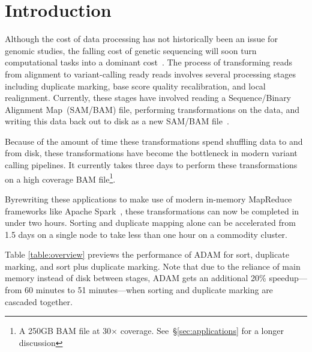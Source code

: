 \documentclass[10pt,twocolumn]{article}
\theoremstyle{plain}
\begin{document}



\cleardoublepage

\section{Introduction}
\label{sec:introduction}

Although the cost of data processing has not historically been an issue for genomic studies, the falling cost of genetic
sequencing will soon turn computational tasks into a dominant cost~\cite{nhgri}. The process of transforming reads
from alignment to variant-calling ready reads involves several processing stages including duplicate marking, base
score quality recalibration, and local realignment. Currently, these stages have involved reading a Sequence/Binary
Alignment Map~(SAM/BAM) file, performing transformations on the data, and writing this data back out to disk as a
new SAM/BAM file~\cite{li09}.

Because of the amount of time these transformations spend shuffling data to and from disk, these transformations have become
the bottleneck in modern variant calling pipelines. It currently takes three days to perform these transformations on a high
coverage BAM file\footnote{A 250GB BAM file at 30$\times$ coverage. See~\S\ref{sec:applications} for a longer discussion}. 

Byrewriting these applications to make use of modern in-memory MapReduce frameworks like Apache Spark~\cite{zaharia10}, these
transformations can now be completed in under two hours. Sorting and duplicate mapping alone can be accelerated from 1.5 days on a single node to take less than one hour on a commodity cluster. 

Table \ref{table:overview} previews the performance of ADAM for sort,  duplicate marking, and sort plus duplicate marking. Note that due to the reliance of main memory instead of disk between stages, ADAM gets an additional 20\% speedup---from 60 minutes to 51 minutes---when sorting and duplicate marking are cascaded together.  
\end{document}

